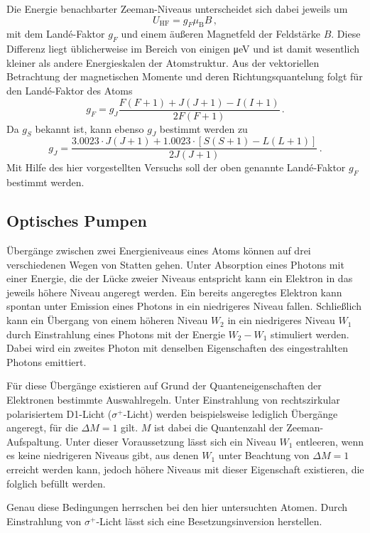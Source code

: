 Die Energie benachbarter Zeeman-Niveaus unterscheidet sich dabei jeweils um
\begin{equation}
\label{eq:zeeman_energie}
    U_\text{HF} = g_F \mu_\text{B} B\,,
\end{equation}
mit dem Landé-Faktor $g_F$ und einem äußeren Magnetfeld der Feldstärke $B$.
Diese Differenz liegt üblicherweise im Bereich von einigen
\si{\micro\electronvolt} und ist damit wesentlich kleiner als andere
Energieskalen der Atomstruktur.
Aus der vektoriellen Betrachtung der magnetischen Momente und deren
Richtungsquantelung folgt für den Landé-Faktor des Atoms
\begin{equation}
\label{eq:lande_faktor}
    g_F = g_J \frac{F(F+1) + J(J+1) - I(I+1)}{2F(F+1)}\,.
\end{equation}
Da $g_S$ bekannt ist, kann ebenso $g_J$ bestimmt werden zu
\begin{equation}
\label{eq:gj}
    g_J = \frac{\num{3.0023}\cdot J(J+1)
                + \num{1.0023}\cdot\left[S(S+1) - L(L+1)\right]}
               {2J(J+1)}
          \,.
\end{equation}
Mit Hilfe des hier vorgestellten Versuchs soll der oben genannte Landé-Faktor
$g_F$ bestimmt werden.

\subsection{Optisches Pumpen}
\label{subsec:optisches_pumpen}
Übergänge zwischen zwei Energieniveaus eines Atoms können auf drei
verschiedenen Wegen von Statten gehen. Unter Absorption eines Photons mit einer
Energie, die der Lücke zweier Niveaus entspricht kann ein Elektron in das
jeweils höhere Niveau angeregt werden.  Ein bereits angeregtes Elektron kann
spontan unter Emission eines Photons in ein niedrigeres Niveau fallen.
Schließlich kann ein Übergang von einem höheren Niveau $W_2$ in ein niedrigeres
Niveau $W_1$ durch Einstrahlung eines Photons mit der Energie $W_2 - W_1$
stimuliert werden.  Dabei wird ein zweites Photon mit denselben Eigenschaften
des eingestrahlten Photons emittiert.

Für diese Übergänge existieren auf Grund der Quanteneigenschaften der
Elektronen bestimmte Auswahlregeln.  Unter Einstrahlung von rechtszirkular
polarisiertem D1-Licht ($\sigma^+$-Licht) werden beispielsweise lediglich
Übergänge angeregt, für die $\Delta M = \num{+1}$ gilt.  $M$ ist dabei die
Quantenzahl der Zeeman-Aufspaltung.  Unter dieser Voraussetzung lässt sich ein
Niveau $W_1$ entleeren, wenn es keine niedrigeren Niveaus gibt, aus denen $W_1$
unter Beachtung von $\Delta M = \num{+1}$ erreicht werden kann, jedoch höhere
Niveaus mit dieser Eigenschaft existieren, die folglich befüllt werden.

Genau diese Bedingungen herrschen bei den hier untersuchten Atomen.
Durch Einstrahlung von $\sigma^+$-Licht lässt sich eine Besetzungsinversion
herstellen.
